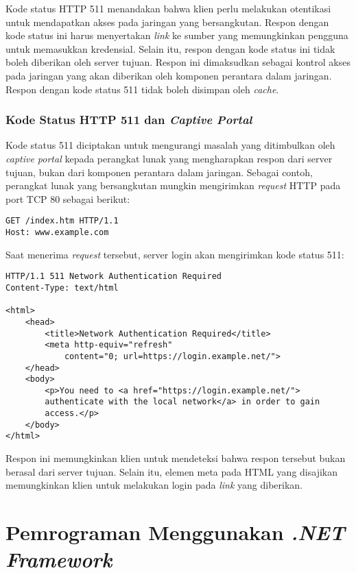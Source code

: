 Kode status HTTP 511 menandakan bahwa klien perlu melakukan otentikasi untuk mendapatkan akses pada jaringan yang bersangkutan. Respon dengan kode status ini harus menyertakan \textit{link} ke sumber yang memungkinkan pengguna untuk memasukkan kredensial. Selain itu, respon dengan kode status ini tidak boleh diberikan oleh server tujuan. Respon ini dimaksudkan sebagai kontrol akses pada jaringan yang akan diberikan oleh komponen perantara dalam jaringan. Respon dengan kode status 511 tidak boleh disimpan oleh \textit{cache}.

\subsubsection{Kode Status HTTP 511 dan \textit{Captive Portal}}
\label{subsubsec:http_511_and_captive_portal}

Kode status 511 diciptakan untuk mengurangi masalah yang ditimbulkan oleh \textit{captive portal} kepada perangkat lunak yang mengharapkan respon dari server tujuan, bukan dari komponen perantara dalam jaringan. Sebagai contoh, perangkat lunak yang bersangkutan mungkin mengirimkan \textit{request} HTTP pada port TCP 80 sebagai berikut:

\begin{lstlisting}
GET /index.htm HTTP/1.1
Host: www.example.com
\end{lstlisting}

Saat menerima \textit{request} tersebut, server login akan mengirimkan kode status 511:

\begin{lstlisting}
HTTP/1.1 511 Network Authentication Required
Content-Type: text/html

<html>
    <head>
        <title>Network Authentication Required</title>
        <meta http-equiv="refresh"
            content="0; url=https://login.example.net/">
    </head>
    <body>
        <p>You need to <a href="https://login.example.net/">
        authenticate with the local network</a> in order to gain
        access.</p>
    </body>
</html>
\end{lstlisting}

Respon ini memungkinkan klien untuk mendeteksi bahwa respon tersebut bukan berasal dari server tujuan. Selain itu, elemen meta pada HTML yang disajikan memungkinkan klien untuk melakukan login pada \textit{link} yang diberikan.



\section{Pemrograman Menggunakan \textit{.NET Framework}}
\label{sec:net_framework}



